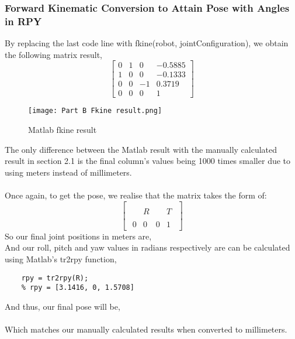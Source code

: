 \subsubsection{Forward Kinematic Conversion to Attain Pose with Angles in RPY}
By replacing the last code line with fkine(robot, jointConfiguration), we obtain the following matrix result,
\begin{equation*}
    \begin{bmatrix}
        0 & 1 & 0  & -0.5885 \\
        1 & 0 & 0  & -0.1333 \\
        0 & 0 & -1 & 0.3719  \\
        0 & 0 & 0  & 1
    \end{bmatrix}
\end{equation*}
\begin{figure}[H]
    \centering
    \texttt{[image: Part B Fkine result.png]}
    \caption{Matlab fkine result}
    \label{fig:fkine result}
\end{figure}
The only difference between the Matlab result with the manually calculated result in section 2.1 is the final column's values being 1000 times smaller due to using meters instead of millimeters.
\\ \\Once again, to get the pose, we realise that the matrix takes the form of:
\begin{equation*}
    \begin{bmatrix}
        {\begin{array}{ccc|c}&&&\\&R&&T\\&&&\\\hline 0&0&0&1\end{array}}
    \end{bmatrix}
\end{equation*}
So our final joint positions in meters are,
\begin{equation*}
    [-0.5885, -0.1333, 0.3719]
\end{equation*}
And our roll, pitch and yaw values in radians respectively are can be calculated using Matlab's tr2rpy function,
\begin{center}
    \begin{lstlisting}
    rpy = tr2rpy(R);
    % rpy = [3.1416, 0, 1.5708]
    \end{lstlisting}
\end{center}
And thus, our final pose will be,
\begin{equation*}
    [-0.5885, -0.1333, 0.3719, 3.1416, 0, 1.5708]
\end{equation*}
\\ Which matches our manually calculated results when converted to millimeters.
